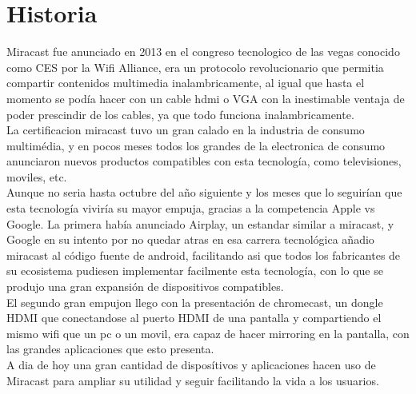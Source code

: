 \section{Historia}

Miracast fue anunciado en 2013 en el congreso tecnologico de las vegas conocido como CES por la Wifi Alliance, era un protocolo revolucionario que permitia compartir contenidos multimedia inalambricamente, al igual que hasta el momento se podía hacer con un cable hdmi o VGA con la inestimable ventaja de poder prescindir de los cables, ya que todo funciona inalambricamente.
\\
La certificacion miracast tuvo un gran calado en la industria de consumo multimédia, y en pocos meses todos los grandes de la electronica de consumo anunciaron nuevos productos compatibles con esta tecnología, como televisiones, moviles, etc.
\\
Aunque no seria hasta octubre del año siguiente y los meses que lo seguirían que esta tecnología viviría su mayor empuja, gracias a la competencia Apple vs Google. La primera había anunciado Airplay, un estandar similar a miracast, y Google en su intento por no quedar atras en esa carrera tecnológica añadio miracast al código fuente de android, facilitando asi que todos los fabricantes de su ecosistema pudiesen implementar facilmente esta tecnología, con lo que se produjo una gran expansión de dispositivos compatibles.
\\
El segundo gran empujon llego con la presentación de chromecast, un dongle HDMI que conectandose al puerto HDMI de una pantalla y compartiendo el mismo wifi que un pc o un movil, era capaz de hacer mirroring en la pantalla, con las grandes aplicaciones que esto presenta.
\\
A dia de hoy una gran cantidad de disposítivos y aplicaciones hacen uso de Miracast para ampliar su utilidad y seguir facilitando la vida a los usuarios.
